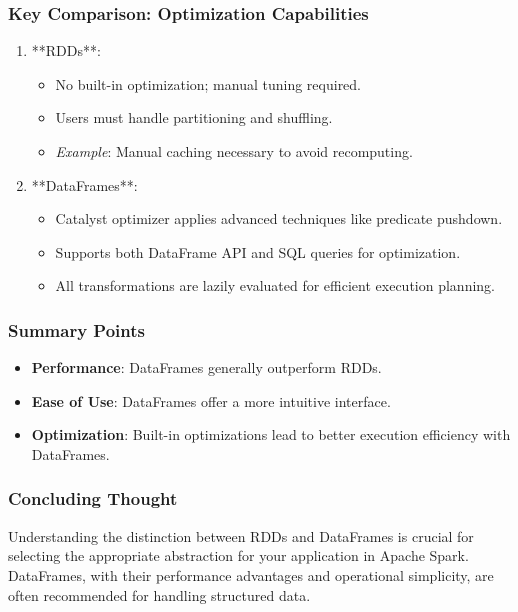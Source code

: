 \documentclass[aspectratio=169]{beamer}
\begin{document}
\begin{frame}
    \frametitle{Key Comparison: Optimization Capabilities}
    \begin{enumerate}
        \item **RDDs**:
            \begin{itemize}
                \item No built-in optimization; manual tuning required.
                \item Users must handle partitioning and shuffling.
                \item \textit{Example}: Manual caching necessary to avoid recomputing.
            \end{itemize}
        \item **DataFrames**:
            \begin{itemize}
                \item Catalyst optimizer applies advanced techniques like predicate pushdown.
                \item Supports both DataFrame API and SQL queries for optimization.
                \item All transformations are lazily evaluated for efficient execution planning.
            \end{itemize}
    \end{enumerate}
\end{frame}

\begin{frame}
    \frametitle{Summary Points}
    \begin{itemize}
        \item \textbf{Performance}: DataFrames generally outperform RDDs.
        \item \textbf{Ease of Use}: DataFrames offer a more intuitive interface.
        \item \textbf{Optimization}: Built-in optimizations lead to better execution efficiency with DataFrames.
    \end{itemize}
\end{frame}

\begin{frame}
    \frametitle{Concluding Thought}
    \begin{block}{}
        Understanding the distinction between RDDs and DataFrames is crucial for selecting the appropriate abstraction for your application in Apache Spark. 
        DataFrames, with their performance advantages and operational simplicity, are often recommended for handling structured data.
    \end{block}
\end{frame}
\end{document}
